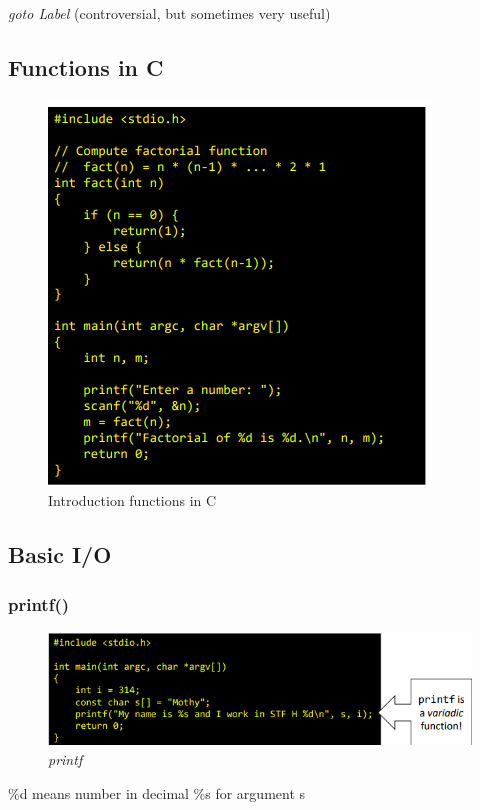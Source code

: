 \documentclass[a4paper,10pt]{article}
\begin{document}
\textit{goto Label} (controversial, but sometimes very useful)
\pagebreak

\subsection{Functions in C}
\begin{figure}[h]
    \centering
    \includegraphics[width=0.75\linewidth]{Pictures/e6.png}
    \caption{Introduction functions in C}
    \label{fig:enter-label}
\end{figure}

\subsection{Basic I/O}
\subsubsection{printf()}
\begin{figure}[h]
    \centering
    \includegraphics[width=1\linewidth]{Pictures/e7.png}
    \caption{\textit{printf}}
    \label{fig:enter-label}
\end{figure}
\%d means number in decimal
\%s for argument s
\end{document}
